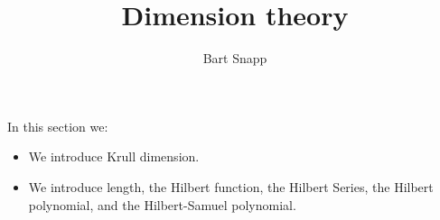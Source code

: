 \documentclass{ximera}
\author{Bart Snapp}
\title{Dimension theory}
\begin{document}
\begin{abstract}
\end{abstract}
\maketitle
In this section we:

\begin{itemize}
\item We introduce Krull dimension.
\item We introduce length, the Hilbert function, the Hilbert Series,
  the Hilbert polynomial, and the Hilbert-Samuel polynomial.
\end{itemize}
\end{document}
